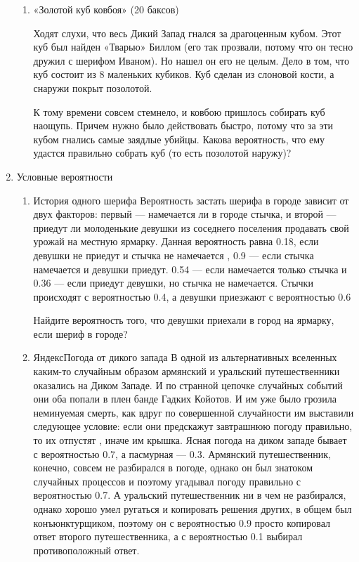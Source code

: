 \documentclass[11pt, a4paper]{article}
\theoremstyle{definition}
\begin{document}
\begin{enumerate}
\begin{enumerate}
    \item «Золотой куб ковбоя» (20 баксов)
    
    Ходят слухи, что весь Дикий Запад гнался за драгоценным кубом. Этот куб был найден «Тварью» Биллом (его так прозвали, потому что он тесно дружил с шерифом Иваном). Но нашел он его не целым. Дело в том, что куб состоит из 8 маленьких кубиков. Куб сделан из слоновой кости, а снаружи покрыт позолотой. 

    К тому времени совсем стемнело, и ковбою пришлось собирать куб наощупь. Причем нужно было действовать быстро, потому что за эти кубом гнались самые заядлые убийцы. Какова вероятность, что ему удастся правильно собрать куб (то есть позолотой наружу)? 
    
\end{enumerate}    


    \item Условные вероятности 
\begin{enumerate}
    \item История одного шерифа
    \newline
    Вероятность застать шерифа в городе зависит от двух факторов: первый — намечается ли в городе стычка, и второй — приедут ли молоденькие девушки из соседнего поселения продавать свой урожай на местную ярмарку. Данная вероятность равна 0.18, если девушки не приедут и стычка не намечается , 0.9 — если стычка намечается и девушки приедут. 0.54 — если намечается только стычка и 0.36 — если приедут девушки, но стычка не намечается. Стычки происходят с вероятностью 0.4, а девушки приезжают с вероятностью 0.6

    Найдите вероятность того, что девушки приехали в город на ярмарку, если шериф в городе?
    \newpage
    \item   ЯндексПогода от дикого запада
      \newline
      В одной из альтернативных вселенных каким-то случайным образом армянский и уральский путешественники оказались на Диком Западе. И по странной цепочке случайных событий они оба попали в плен банде Гадких Койотов. И им уже было грозила неминуемая смерть, как вдруг по совершенной случайности им выставили следующее условие: если они предскажут завтрашнюю погоду правильно, то их отпустят , иначе им крышка. Ясная погода на диком западе бывает с вероятностью 0.7, а пасмурная — 0.3. Армянский путешественник, конечно, совсем не разбирался в погоде, однако он был знатоком случайных процессов и поэтому угадывал погоду правильно с вероятностью 0.7. А уральский путешественник ни в чем не разбирался, однако хорошо умел ругаться и копировать решения других, в общем был конъюнктурщиком, поэтому он с вероятностью 0.9 просто копировал ответ второго путешественника, а с вероятностью 0.1 выбирал противоположный ответ.


\end{enumerate}
\end{enumerate}
\end{document}
